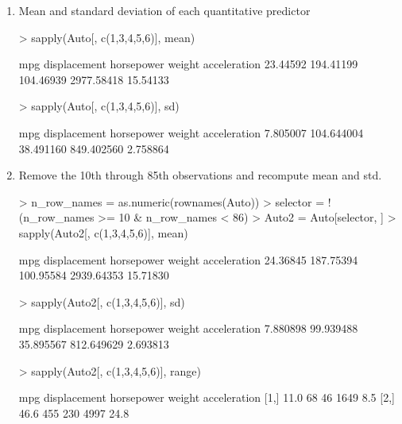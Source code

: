 \documentclass[a4paper]{article}
\begin{document}
\begin{enumerate}
\item Mean and standard deviation of each quantitative predictor
\begin{Schunk}
\begin{Sinput}
> sapply(Auto[, c(1,3,4,5,6)], mean)
\end{Sinput}
\begin{Soutput}
         mpg displacement   horsepower       weight acceleration 
    23.44592    194.41199    104.46939   2977.58418     15.54133 
\end{Soutput}
\begin{Sinput}
> sapply(Auto[, c(1,3,4,5,6)], sd)
\end{Sinput}
\begin{Soutput}
         mpg displacement   horsepower       weight acceleration 
    7.805007   104.644004    38.491160   849.402560     2.758864 
\end{Soutput}
\end{Schunk}


\item Remove the 10th through 85th observations and recompute mean and std.
\begin{Schunk}
\begin{Sinput}
> n_row_names = as.numeric(rownames(Auto))
> selector = !(n_row_names >= 10 & n_row_names < 86)
> Auto2 = Auto[selector, ]
> sapply(Auto2[, c(1,3,4,5,6)], mean)
\end{Sinput}
\begin{Soutput}
         mpg displacement   horsepower       weight acceleration 
    24.36845    187.75394    100.95584   2939.64353     15.71830 
\end{Soutput}
\begin{Sinput}
> sapply(Auto2[, c(1,3,4,5,6)], sd)
\end{Sinput}
\begin{Soutput}
         mpg displacement   horsepower       weight acceleration 
    7.880898    99.939488    35.895567   812.649629     2.693813 
\end{Soutput}
\begin{Sinput}
> sapply(Auto2[, c(1,3,4,5,6)], range)
\end{Sinput}
\begin{Soutput}
      mpg displacement horsepower weight acceleration
[1,] 11.0           68         46   1649          8.5
[2,] 46.6          455        230   4997         24.8
\end{Soutput}
\end{Schunk}


\end{enumerate}
\end{document}
